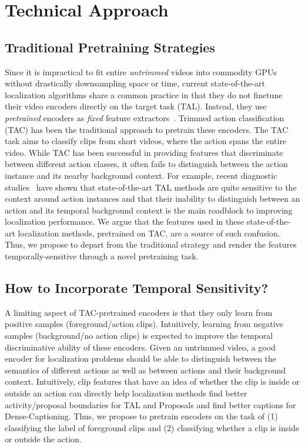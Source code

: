 \documentclass[10pt,twocolumn,letterpaper]{article}
\begin{document}
 \section{Technical Approach}\label{sec:technical_approach}

\subsection{Traditional Pretraining Strategies} 
Since it is impractical to fit entire \emph{untrimmed} videos into commodity GPUs without drastically downsampling space or time, current state-of-the-art localization algorithms share a common practice in that they do not finetune their video encoders directly on the target task (\eg TAL). Instead, they use \textit{pretrained} encoders as \textit{fixed} feature extractors~\cite{bmt,Lin_2019_ICCV,xu2020gtad,Zeng_2019_ICCV}. Trimmed action classification (TAC) has been the traditional approach to pretrain these encoders. The TAC task aims to classify clips from short videos, where the action spans the entire video. While TAC has been successful in providing features that discriminate between different action classes, it often fails to distinguish between the action instance and its nearby background context. For example, recent diagnostic studies~\cite{alwassel_eccv_2018} have shown that state-of-the-art TAL methods are quite sensitive to the context around action instances and that their inability to distinguish between an action and its temporal background context is the main roadblock to improving localization performance. We argue that the features used in these state-of-the-art localization methods, pretrained on TAC, are a source of such confusion. Thus, we propose to depart from the traditional strategy and render the features temporally-sensitive through a novel pretraining task. 


\subsection{How to Incorporate Temporal Sensitivity?}
A limiting  aspect of TAC-pretrained encoders is that they only learn from positive samples (foreground/action clips). Intuitively, learning from negative samples (background/no action clips) is expected to improve the temporal discriminative ability of these encoders. Given an untrimmed video, a good encoder for localization problems should be able to distinguish between the semantics of different actions as well as between actions and their background context.  Intuitively, clip features that have an idea of whether the clip is inside or outside an action can directly help localization methods find better activity/proposal boundaries for TAL and Proposals and find better captions for Dense-Captioning. Thus, we propose to pretrain encoders on the task of (1) classifying the label of foreground clips and (2) classifying whether a clip is inside or outside the action.
\end{document}
